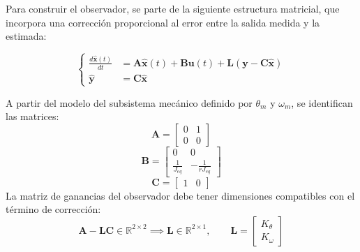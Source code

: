 \documentclass[blue,fullpaper]{ludusofficial}  %
\begin{document}
Para construir el observador, se parte de la siguiente estructura matricial, que incorpora una corrección proporcional al error entre la salida medida y la estimada:

\[
\left\{
\begin{aligned}
\frac{d \mathbf{\hat{x}}(t) }{dt} & = \mathbf{A} \mathbf{\hat{x}}(t) + \mathbf{B}\mathbf{u}(t) + \mathbf{L}(\mathbf{y}-\mathbf{C}\mathbf{\hat{x}}) \\
\mathbf{\hat{y}} & = \mathbf{C} \mathbf{\hat{x}}
\end{aligned}
\right.
\]

A partir del modelo del subsistema mecánico definido por $\theta_{m}$ y $\omega_{m}$, se identifican las matrices:
\[
\mathbf{A}=\begin{bmatrix} 0 & 1 \\0 & 0 \end{bmatrix}
\]
\[
\mathbf{B} = \begin{bmatrix} 0 & 0 \\ \frac{1}{J_{eq}} & -\frac{1}{rJ_{eq}} \end{bmatrix}
\]
\[
\mathbf{C}=\begin{bmatrix} 1 & 0\end{bmatrix}
\]
La matriz de ganancias del observador debe tener dimensiones compatibles con el término de corrección:
\[
\mathbf{A}-\mathbf{L}\mathbf{C} \in \mathbb{R}^{2\times2} \implies \mathbf{L} \in \mathbb{R}^{2\times1}, \qquad \mathbf{L}=\begin{bmatrix} K_{\theta} \\ K_{\omega} \end{bmatrix}
\]
\end{document}
